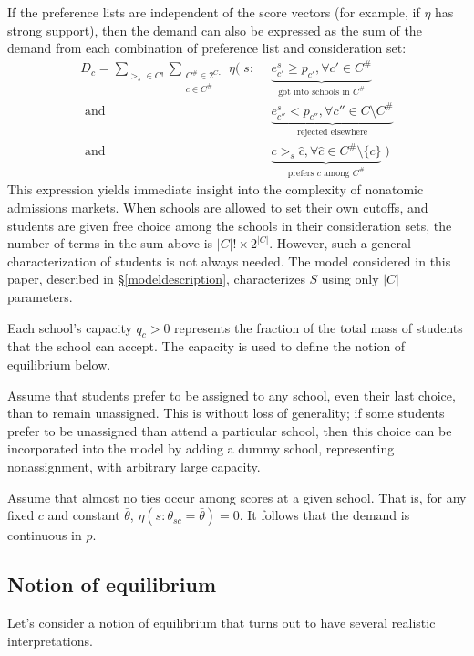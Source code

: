 \documentclass[12pt]{article}
\theoremstyle{definition}
\begin{document}
If the preference lists are independent of the score vectors (for example, if $\eta$ has strong support), then the demand can also be expressed as the sum of the demand from each combination of preference list and consideration set:
\begin{align*}D_c = 
\sum_{>_s \in C!} \sum_{\substack{C^\# \in 2^{C}:\\ c \in C^\#}}
\eta\Big(\;s:&~~\underbrace{e_{c'}^s \geq p_{c'}, \forall c' \in C^\#}_{\text{got into schools in } C^\# } \\
\text{ and} &~~\underbrace{e_{c''}^s < p_{c''}, \forall c'' \in C \setminus C^\#}_{\text{rejected elsewhere}} \\
\text{ and} &~~\underbrace{c >_s \hat c, \forall \hat c \in C^\#\setminus \{c\}}_{\text{prefers } c \text{ among } C^\#} \;\Big)
\end{align*}
This expression yields immediate insight into the complexity of nonatomic admissions markets. When schools are allowed to set their own cutoffs, and students are given free choice among the schools in their consideration sets, the number of terms in the sum above is $|C|!\times2^{|C|}$. However, such a general characterization of students is not always needed. The model considered in this paper, described in \S\ref{modeldescription}, characterizes $S$ using only $|C|$ parameters.

Each school's capacity $q_c > 0$ represents the fraction of the total mass of students that the school can accept. The capacity is used to define the notion of equilibrium below.

Assume that students prefer to be assigned to any school, even their last choice, than to remain unassigned. This is without loss of generality; if some students prefer to be unassigned than attend a particular school, then this choice can be incorporated into the model by adding a dummy school, representing nonassignment, with arbitrary large capacity. 

Assume that almost no ties occur among scores at a given school. That is, for any fixed $c$ and constant $\bar \theta$, $\eta( s: \theta_{sc} = \bar \theta) = 0$. It follows that the demand is continuous in $p$. 

\subsection{Notion of equilibrium}
Let's consider a notion of equilibrium that turns out to have several realistic interpretations. 
\end{document}
